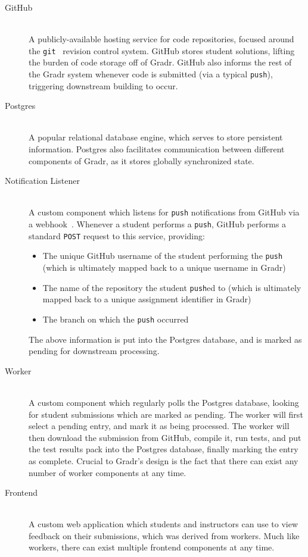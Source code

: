 \documentclass{scrartcl}
\begin{document}
\begin{description}
  \item[GitHub~\cite{github}] \hfill \\
    A publicly-available hosting service for code repositories, focused around the \texttt{git}~\cite{git} revision control system.
    GitHub stores student solutions, lifting the burden of code storage off of Gradr.
    GitHub also informs the rest of the Gradr system whenever code is submitted (via a typical \texttt{push}), triggering downstream building to occur.

  \item[Postgres~\cite{postgres}] \hfill \\
    A popular relational database engine, which serves to store persistent information.
    Postgres also facilitates communication between different components of Gradr, as it stores globally synchronized state.

  \item[Notification Listener] \hfill \\
    A custom component which listens for \texttt{push} notifications from GitHub via a webhook~\cite{github_webhook}.
    Whenever a student performs a \texttt{push}, GitHub performs a standard \texttt{POST} request to this service, providing:
    \begin{itemize}
      \item The unique GitHub username of the student performing the \texttt{push} (which is ultimately mapped back to a unique username in Gradr)
      \item The name of the repository the student \texttt{push}ed to (which is ultimately mapped back to a unique assignment identifier in Gradr)
      \item The branch on which the \texttt{push} occurred
    \end{itemize}
    The above information is put into the Postgres database, and is marked as pending for downstream processing.

  \item[Worker] \hfill \\
    A custom component which regularly polls the Postgres database, looking for student submissions which are marked as pending.
    The worker will first select a pending entry, and mark it as being processed.
    The worker will then download the submission from GitHub, compile it, run tests, and put the test results pack into the Postgres database, finally marking the entry as complete.
    Crucial to Gradr's design is the fact that there can exist any number of worker components at any time.

  \item[Frontend] \hfill \\
    A custom web application which students and instructors can use to view feedback on their submissions, which was derived from workers.
    Much like workers, there can exist multiple frontend components at any time.
\end{description}
\end{document}

